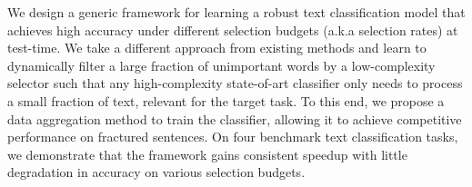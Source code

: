 We design a generic framework for learning a robust text classification model that achieves high accuracy under different selection budgets  (a.k.a selection rates) at test-time. We take a different approach from existing methods and learn to dynamically filter a large fraction of unimportant words by a low-complexity selector such that any high-complexity state-of-art classifier only needs to process a small fraction of text, relevant for the target task. To this end, we propose a data aggregation method to train the classifier, allowing it to achieve competitive performance on fractured sentences. On four benchmark text classification tasks, we demonstrate that the framework gains consistent speedup with little degradation in accuracy on various selection budgets.